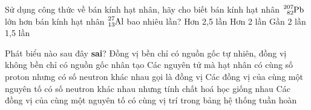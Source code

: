 \begin{ex}
	Sử dụng công thức về bán kính hạt nhân, hãy cho biết bán kính hạt nhân $\ce{_{82}^{207}Pb}$ lớn hơn bán kính hạt nhân $\ce{_{13}^{27}Al}$ bao nhiêu lần?
	\choice
	{Hơn 2,5 lần}
	{Hơn 2 lần}
	{\True Gần 2 lần}
	{1,5 lần}
\end{ex}
\begin{ex}
	Phát biểu nào sau đây \textbf{sai}?	
	\choice
	{\True Đồng vị bền chỉ có nguồn gốc tự nhiên, đồng vị không bền chỉ có nguồn gốc nhân tạo}
	{Các nguyên tử mà hạt nhân có cùng số proton nhưng có số neutron khác nhau gọi là đồng vị}
	{Các đồng vị của cùng một nguyên tố có số neutron khác nhau nhưng tính chất hoá học giống nhau}
	{Các đồng vị của cùng một nguyên tố có cùng vị trí trong bảng hệ thống tuần hoàn}
	\loigiai{}
\end{ex}

